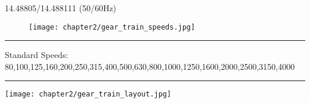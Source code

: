 \newpage
{}
\setcounter{section}{10}
\setcounter{page}{2}
14.48805/14.488111 (50/60Hz)

\vspace{-.5cm}

\begin{figure}[h]
    \centering
    \texttt{[image: chapter2/gear\_train\_speeds.jpg]}
\end{figure}

\rule{1.08\textwidth}{0.5pt}
\footnotesize Standard Speeds: 80,100,125,160,200,250,315,400,500,630,800,1000,1250,1600,2000,2500,3150,4000
\rule{1.08\textwidth}{0.5pt}

\vspace{.5cm}

\texttt{[image: chapter2/gear\_train\_layout.jpg]}
